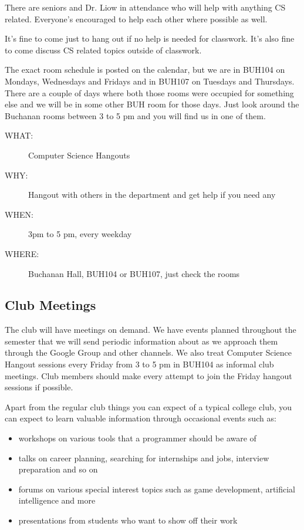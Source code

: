 There are seniors and Dr. Liow in attendance who will help with anything CS
related. Everyone's encouraged to help each other where possible as well.

It's fine to come just to hang out if no help is needed for classwork. It's
also fine to come discuss CS related topics outside of classwork.

The exact room schedule is posted on the calendar, but we are in BUH104 on
Mondays, Wednesdays and Fridays and in BUH107 on Tuesdays and Thursdays. There
are a couple of days where both those rooms were occupied for something else
and we will be in some other BUH room for those days. Just look around the
Buchanan rooms between 3 to 5 pm and you will find us in one of them.

\begin{description}
\item[{WHAT:}] Computer Science Hangouts
\item[{WHY:}] Hangout with others in the department and get help if you need any
\item[{WHEN:}] 3pm to 5 pm, every weekday
\item[{WHERE:}] Buchanan Hall, BUH104 or BUH107, just check the rooms
\end{description}

\newpage

\subsection{Club Meetings}
\label{sec-3-3}

The club will have meetings on demand. We have events planned throughout the
semester that we will send periodic information about as we approach them
through the Google Group and other channels. We also treat Computer Science
Hangout sessions every Friday from 3 to 5 pm in BUH104 as informal club
meetings. Club members should make every attempt to join the Friday hangout
sessions if possible.

Apart from the regular club things you can expect of a typical
college club, you can expect to learn valuable information through occasional
events such as:
\begin{itemize}
\item workshops on various tools that a programmer should be aware of
\item talks on career planning, searching for internships and jobs, interview
preparation and so on
\item forums on various special interest topics such as game development,
artificial intelligence and more
\item presentations from students who want to show off their work
\end{itemize}

